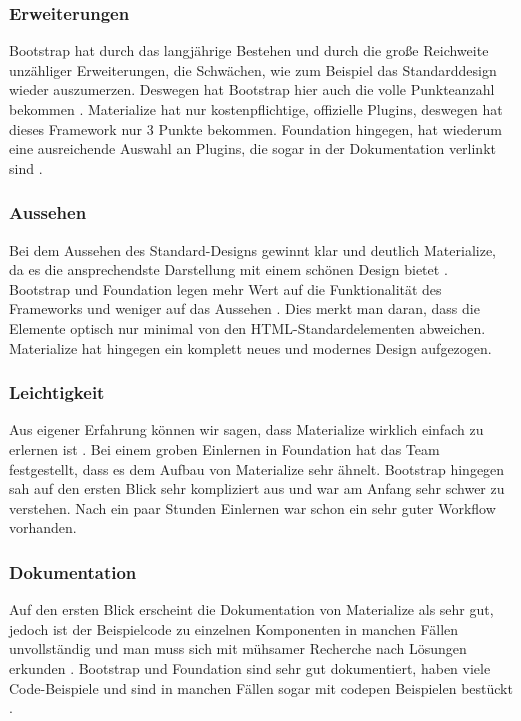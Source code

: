\subsubsection{Erweiterungen}
\label{chapter:study-frontend-vergleich-erweiterungen}
Bootstrap hat durch das langjährige Bestehen und durch die große Reichweite unzähliger Erweiterungen, die Schwächen, wie zum Beispiel das Standarddesign wieder auszumerzen. Deswegen hat Bootstrap hier auch die volle Punkteanzahl bekommen \cite{introduction-bootstrap}. Materialize hat nur kostenpflichtige, offizielle Plugins, deswegen hat dieses Framework nur 3 Punkte bekommen. Foundation hingegen, hat wiederum eine ausreichende Auswahl an Plugins, die sogar in der Dokumentation verlinkt sind \cite{foundation-webdocu}. 
\subsubsection{Aussehen}
\label{chapter:study-frontend-vergleich-aussehen}
Bei dem Aussehen des Standard-Designs gewinnt klar und deutlich Materialize, da es die ansprechendste Darstellung mit einem schönen Design bietet \cite{WebDocMaterialize}. Bootstrap und Foundation legen mehr Wert auf die Funktionalität des Frameworks und weniger auf das Aussehen \cite{bootstrap-docu, foundation-webdocu}. Dies merkt man daran, dass die Elemente optisch nur minimal von den HTML-Standardelementen abweichen. Materialize hat hingegen ein komplett neues und modernes Design aufgezogen.
\subsubsection{Leichtigkeit}
\label{chapter:study-frontend-vergleich-leichtigkeit}
Aus eigener Erfahrung können wir sagen, dass Materialize wirklich einfach zu erlernen ist \cite{WebDocMaterialize}. Bei einem groben Einlernen in Foundation hat das Team festgestellt, dass es dem Aufbau von Materialize sehr ähnelt. Bootstrap hingegen sah auf den ersten Blick sehr kompliziert aus und war am Anfang sehr schwer zu verstehen. Nach ein paar Stunden Einlernen war schon ein sehr guter Workflow vorhanden.
\subsubsection{Dokumentation}
\label{chapter:study-frontend-vergleich-doku}
Auf den ersten Blick erscheint die Dokumentation von Materialize als sehr gut, jedoch ist der Beispielcode zu einzelnen Komponenten in manchen Fällen unvollständig und man muss sich mit mühsamer Recherche nach Lösungen erkunden \cite{WebDocMaterialize}. Bootstrap und Foundation sind sehr gut dokumentiert, haben viele Code-Beispiele und sind in manchen Fällen sogar mit \Gls{codepen} Beispielen bestückt \cite{bootstrap-docu, foundation-webdocu}.

